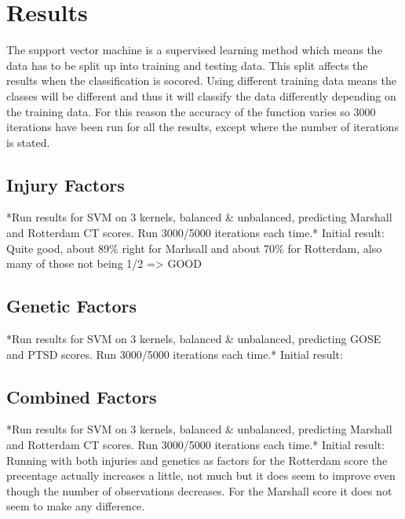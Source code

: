 \documentclass[11pt]{article}
\begin{document}
\section{Results}
The support vector machine is a supervised learning method which means the data has to be split up into training and testing data. This split affects the results when the classification is socored. Using different training data means the classes will be different and thus it will classify the data differently depending on the training data. For this reason the accuracy of the function varies so 3000 iterations have been run for all the results, except where the number of iterations is stated.
\subsection{Injury Factors}
*Run results for SVM on 3 kernels, balanced \& unbalanced, predicting Marshall and Rotterdam CT scores. Run 3000/5000 iterations each time.*
Initial result: Quite good, about 89\% right for Marhsall and about 70\% for Rotterdam, also many of those not being 1/2 => GOOD

\subsection{Genetic Factors}
*Run results for SVM on 3 kernels, balanced \& unbalanced, predicting GOSE and PTSD scores. Run 3000/5000 iterations each time.*
Initial result:

\subsection{Combined Factors}
*Run results for SVM on 3 kernels, balanced \& unbalanced, predicting Marshall and Rotterdam CT scores. Run 3000/5000 iterations each time.*
Initial result: Running with both injuries and genetics as factors for the Rotterdam score the precentage actually increases a little, not much but it does seem to improve even though the number of observations decreases. For the Marshall score it does not seem to make any difference.
\end{document}
